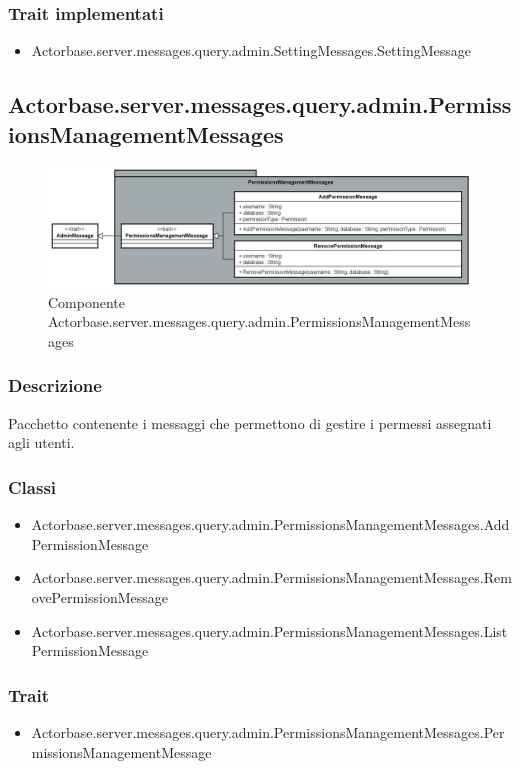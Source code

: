 \documentclass[a4paper]{article}
\begin{document}
			\subsubsection{Trait implementati}
				\begin{itemize}
					\item Actorbase.server.messages.query.admin.SettingMessages.SettingMessage
					\end{itemize}
				
		\subsection{Actorbase.server.messages.query.admin.PermissionsManagementMessages}
		
			\begin{figure}[H]
				\centering
				\includegraphics[width=\textwidth]{ST/Server/userPermissionsManagementLevel.jpg}
				\caption{Componente Actorbase.server.messages.query.admin.PermissionsManagementMessages}
			\end{figure}
			
			\subsubsection{Descrizione}
				Pacchetto contenente i messaggi che permettono di gestire i permessi assegnati agli utenti.
			\subsubsection{Classi}
				\begin{itemize}
					\item Actorbase.server.messages.query.admin.PermissionsManagementMessages.AddPermissionMessage
					\item Actorbase.server.messages.query.admin.PermissionsManagementMessages.RemovePermissionMessage
					\item Actorbase.server.messages.query.admin.PermissionsManagementMessages.ListPermissionMessage
				\end{itemize}
				
			\subsubsection{Trait}
				\begin{itemize}
					\item Actorbase.server.messages.query.admin.PermissionsManagementMessages.PermissionsManagementMessage
				\end{itemize}
		
\end{document}
